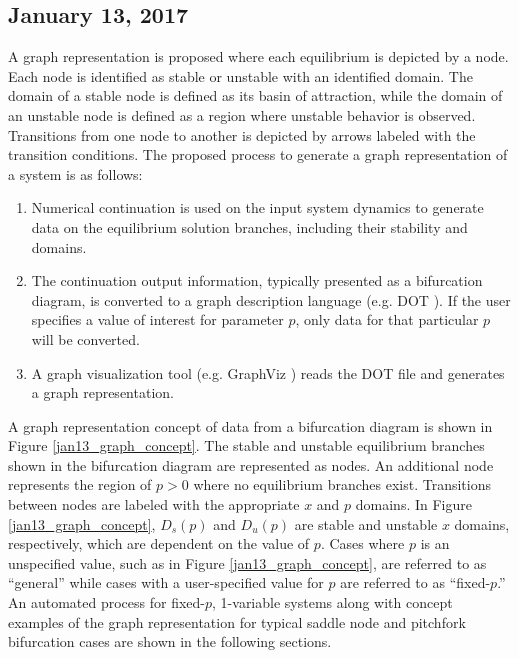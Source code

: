 \documentclass[12pt]{article}
\begin{document}
\subsection{January 13, 2017}
\label{jan13}
A graph representation is proposed where each equilibrium is depicted by a node. Each node is identified as stable or unstable with an identified domain. The domain of a stable node is defined as its basin of attraction, while the domain of an unstable node is defined as a region where unstable behavior is observed. Transitions from one node to another is depicted by arrows labeled with the transition conditions. The proposed process to generate a graph representation of a system is as follows:
	
\begin{enumerate}
  \item Numerical continuation is used on the input system dynamics to generate data on the equilibrium solution branches, including their stability and domains.
  \item The continuation output information, typically presented as a bifurcation diagram, is converted to a graph description language (e.g. DOT \cite{Koutsofios}). If the user specifies a value of interest for parameter $p$, only data for that particular $p$ will be converted.
  \item A graph visualization tool (e.g. GraphViz \cite{Ellson}) reads the DOT file and generates a graph representation.
\end{enumerate}

A graph representation concept of data from a bifurcation diagram is shown in Figure \ref{jan13_graph_concept}. The stable and unstable equilibrium branches shown in the bifurcation diagram are represented as nodes. An additional node represents the region of $p>0$ where no equilibrium branches exist. Transitions between nodes are labeled with the appropriate $x$ and $p$ domains. In Figure \ref{jan13_graph_concept}, $D_s(p)$ and $D_u(p)$ are stable and unstable $x$ domains, respectively, which are dependent on the value of $p$. Cases where $p$ is an unspecified value, such as in Figure \ref{jan13_graph_concept}, are referred to as ``general'' while cases with a user-specified value for $p$ are referred to as ``fixed-$p$.'' An automated process for fixed-$p$, 1-variable systems along with concept examples of the graph representation for typical saddle node and pitchfork bifurcation cases are shown in the following sections. 
\end{document}

